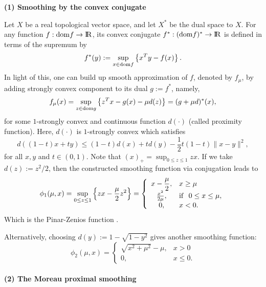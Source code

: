 \documentclass[12pt]{article}
\renewcommand{\Re}{{\rm I}\! {\rm R}}
\newcommand{\ds}{\displaystyle}
\begin{document}
 \noindent
 {\bf (1) Smoothing by the convex conjugate}

 \medskip

 Let $X$ be a real topological vector space, and let $X^{*}$ be the dual
 space to $X$. For any function $f: {\rm dom} f  \to \Re$, its convex conjugate
 $f^*: ({\rm dom}f)^* \to \Re$ is defined in terms of the supremum by
 \[
 f^*(y) := \sup_{x \in {\rm dom} f} \left \{x^T y - f(x) \right \}.
 \]
 In light of this, one can build up smooth approximation of $f$, denoted by $f_{\mu}$,
 by adding strongly convex component to its dual $g:=f^*$, namely,
 \[
 f_{\mu}(x) = \sup_{z\in {\rm dom} g} \left \{z^T x - g(x) - \mu d(z) \right \}
 = (g+\mu d)^*(x),
 \]
 for some $1$-strongly convex and continuous function $d(\cdot)$ (called proximity
 function). Here, $d(\cdot)$ is $1$-strongly convex which satisfies
 \[
 d( (1-t)x + t y) \leq (1-t) d(x) + t d(y) - \frac{1}{2} t(1-t) \|x-y\|^2,
 \]
 for all $x, y$ and $t \in (0,1)$. Note that
 \(
 (x)_+ = \sup_{0 \leq z \leq 1 }zx.
 \)
 If we take $d(z):=z^2/2$, then the constructed smoothing function via conjugation
 leads to
 \begin{equation}\label{phi1}
 \phi_1(\mu, x)=\sup_{0 \leq z \leq 1}\left\{ zx-\frac{\mu}{2}z^2 \right \}
 = \left\{
 \begin{array}{cl}
  x -\ds \frac{\mu}{2},  &    x  \geq \mu\\
 \frac{x^2}{2\mu},       & {\rm if} \ \  0 \leq x  \leq \mu, \\
  0,                     &    x <0. \\
 \end{array}
 \right.
 \end{equation}
 Which is the Pinar-Zenios function \cite{PZ1995}.

 Alternatively, choosing $d(y):=1-\sqrt{1-y^2}$
 gives another smoothing function:
 \begin{equation}\label{phi2}
 \phi_2(\mu, x) =\left\{
    \begin{array}{cl}
            \sqrt{x^2+\mu^2}-\mu, &    x  > 0\\
            0,                   &    x \leq 0.
    \end{array}
    \right.
 \end{equation}
\\

 \noindent
 {\bf (2) The Moreau proximal smoothing}

 \medskip
\end{document}
